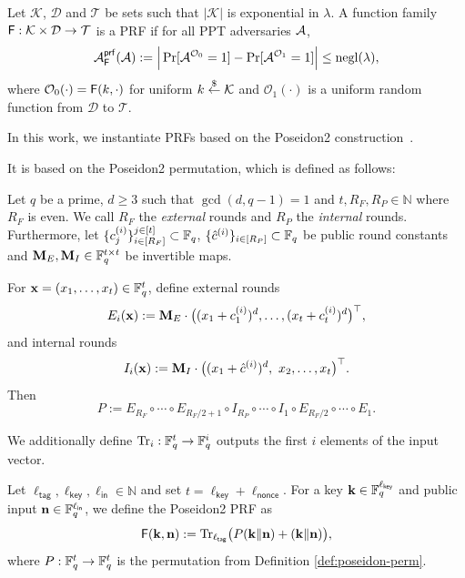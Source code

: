 \begin{definition}\label{def:prf}
Let $\mathcal{K}$, $\mathcal{D}$ and $\mathcal{T}$ be sets such that $|\mathcal{K}|$ is exponential in $\lambda$.
A function family $\mathsf{F}:\mathcal{K}\times\mathcal{D}\to \mathcal{T}$ is a PRF if for all PPT adversaries
$\mathcal{A}$,
\[
  \mathcal{A}^{\mathsf{prf}}_{\mathsf{F}}(\mathcal{A})
  := \Big|\Pr[\mathcal{A}^{\mathcal{O}_0}=1]-\Pr[\mathcal{A}^{\mathcal{O}_1}=1]\Big|
  \le \mathrm{negl}(\lambda),
\]
where $\mathcal{O}_0(\cdot)=\mathsf{F}(k,\cdot)$ for uniform $k\overset{\$}{\leftarrow} \mathcal{K}$ and $\mathcal{O}_1(\cdot)$ is a uniform
random function from $\mathcal{D}$ to $\mathcal{T}$.
\end{definition}


In this work, we instantiate PRFs based on the Poseidon2 construction~\cite{AFRICACRYPT:GraKhoSch23}.

It is based on the Poseidon2 permutation, which is defined as follows:
\begin{definition}\label{def:poseidon-perm}
	Let $q$ be a prime, $d\ge 3$ such that $\gcd(d,q-1)=1$ and $t,R_F,R_P\in \mathbb{N}$ where $R_F$ is even.
	We call $R_F$ the \emph{external} rounds and $R_P$ the  \emph{internal} rounds. Furthermore, let
	 $\{c^{(i)}_j\}_{i\in [R_F]}^{j\in [t]}\subset\mathbb{F}_q$, $\{\hat c^{(i)}\}_{i\in [R_P]}\subset\mathbb{F}_q$ be public round constants and $\mathbf{M}_E,\mathbf{M}_I\in\mathbb{F}_q^{t\times t}$ be invertible maps.
	
	For $\mathbf{x}=(x_1,\dots,x_t)\in\mathbb{F}_q^t$, define external rounds
	\[
	E_i(\mathbf{x}) := \mathbf{M}_E \cdot \big((x_1+c^{(i)}_1)^d,\dots,(x_t+c^{(i)}_t)^d\big)^\top,
	\]
	and internal rounds
	\[
	I_i(\mathbf{x}) := \mathbf{M}_I \cdot \big((x_1+\hat c^{(i)})^d,\ x_2,\dots,x_t\big)^\top.
	\]
	Then
	\[
	P := E_{R_F}\circ\cdots\circ E_{R_F/2+1}\circ I_{R_P}\circ\cdots\circ I_{1}\circ E_{R_F/2}\circ\cdots\circ E_1.
	\]
\end{definition}

We additionally define
$\mathrm{Tr}_i:\mathbb{F}_q^t\to \mathbb{F}_q^{i}$ outputs the first $i$ elements of the input vector.

\begin{definition}\label{def:poseidon-prf}
Let $\ell_{\mathsf{tag}},\ell_{\mathsf{key}},\ell_{\mathsf{in}}\in \mathbb{N}$ and set $t=\ell_{\mathsf{key}}+\ell_{\mathsf{nonce}}$. For a key 
 $\mathbf{k}\in\mathbb{F}_q^{\ell_{\mathsf{key}}}$  and public input 
$\mathbf{n} \in\mathbb{F}_q^{\ell_{\mathsf{in}}}$, we define the Poseidon2 PRF as 
\[
  \mathsf{F}(\mathbf{k},\mathbf{n}) := \mathrm{Tr}_{\ell_{\mathsf{tag}}}\big(P(\mathbf{k}\Vert \mathbf{n}) + (\mathbf{k}\Vert \mathbf{n})\big),
\]
where $P:\mathbb{F}_q^t\to \mathbb{F}_q^t$ is the permutation from Definition \ref{def:poseidon-perm}.
\end{definition}



